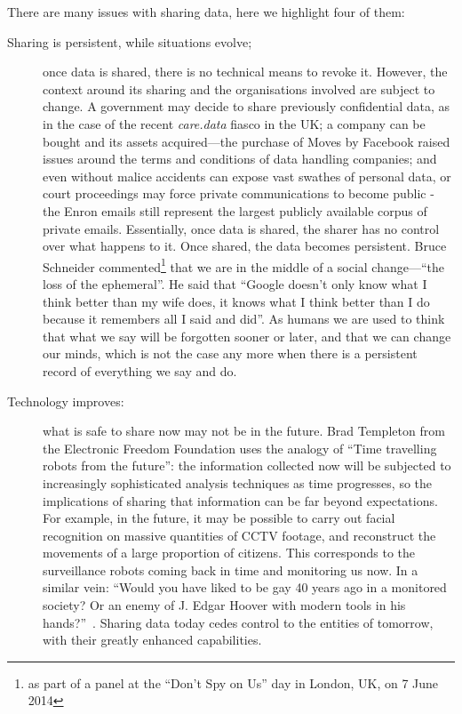 \documentclass{IOS-Book-Article}     %
\begin{document}
There are many issues with sharing data, here we highlight four of them:
\begin{description}
  \item[Sharing is persistent, while situations evolve;] once data is shared,
  there is no technical means to revoke it. However, the context around its sharing and the
  organisations involved are subject to change. 
  A government may decide to share previously confidential data, as in the case of the recent \emph{care.data} fiasco in the UK; a company can be
bought and its assets acquired---the purchase of Moves by Facebook raised issues
around the terms and conditions of data handling companies; and even without
malice accidents can expose vast swathes of personal data, or court proceedings
may force private communications to become public - the Enron emails still
represent the largest publicly available corpus of private emails. Essentially,
once data is shared, the sharer has no control over what happens to it. Once shared, the data becomes persistent. Bruce Schneider commented\footnote{as part of a panel at the ``Don't Spy on Us'' day in London, UK, on 7 June 2014} that we are in the middle of a social change---``the loss of the ephemeral''. He said that ``Google doesn't only know what I think better than my wife does, it knows what I think better than I do because it remembers all I said and did''. As humans we are used to think that what we say will be forgotten sooner or later, and that we can change our minds, which is not the case any more when there is a persistent record of everything we say and do.

\item[Technology improves:] what is safe to share now may not be in the
future. Brad Templeton from the Electronic Freedom Foundation uses the analogy
of ``Time travelling robots from the future'': the information collected now
will be subjected to increasingly sophisticated analysis techniques as time
progresses, so the implications of sharing that information can be far beyond
expectations. For example, in the future, it may be possible to carry out facial
recognition on massive quantities of CCTV footage, and reconstruct the movements
of a large proportion of citizens. This corresponds to the surveillance
robots coming back in time and monitoring us now. In a similar vein: ``Would
you have liked to be gay 40 years ago in a monitored society? Or an enemy of J.
Edgar Hoover with modern tools in his hands?''~\cite{templetonWatched}. Sharing
data today cedes control to the entities of tomorrow, with their greatly
enhanced capabilities.


\end{description}
\end{document}
